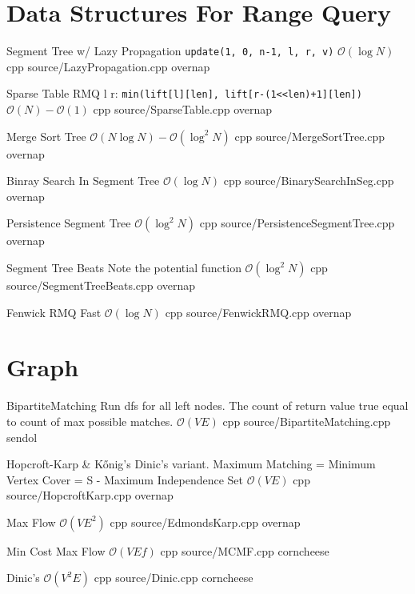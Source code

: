 \documentclass[landscape, 10pt, a4paper, oneside, twocolumn]{extarticle}
\begin{document}
\maketitlepage



\section{Data Structures For Range Query}

\Algorithm
{Segment Tree w/ Lazy Propagation}
{\texttt{update(1, 0, n-1, l, r, v)}}
{$\mathcal{O}(\log{N})$}
{cpp}
{source/LazyPropagation.cpp}
{overnap}

\Algorithm
{Sparse Table}
{RMQ l r: \texttt{min(lift[l][len], lift[r-(1<<len)+1][len])}}
{$\mathcal{O}(N)-\mathcal{O}(1)$}
{cpp}
{source/SparseTable.cpp}
{overnap}

\Algorithm
{Merge Sort Tree}
{}
{$\mathcal{O}(N\log{N})-\mathcal{O}(\log^2{N})$}
{cpp}
{source/MergeSortTree.cpp}
{overnap}

\Algorithm
{Binray Search In Segment Tree}
{}
{$\mathcal{O}(\log{N})$}
{cpp}
{source/BinarySearchInSeg.cpp}
{overnap}

\Algorithm
{Persistence Segment Tree}
{}
{$\mathcal{O}(\log^2{N})$}
{cpp}
{source/PersistenceSegmentTree.cpp}
{overnap}

\Algorithm
{Segment Tree Beats}
{Note the potential function}
{$\mathcal{O}(\log^2{N})$}
{cpp}
{source/SegmentTreeBeats.cpp}
{overnap}

\Algorithm
{Fenwick RMQ}
{}
{Fast $\mathcal{O}(\log{N})$}
{cpp}
{source/FenwickRMQ.cpp}
{overnap}

\section{Graph}

\Algorithm
{BipartiteMatching}
{Run dfs for all left nodes. The count of return value true equal to count of max possible matches.}
{$\mathcal{O}(VE)$}
{cpp}
{source/BipartiteMatching.cpp}
{sendol}

\Algorithm
{Hopcroft-Karp \& Kőnig's}
{Dinic's variant. Maximum Matching = Minimum Vertex Cover = S - Maximum Independence Set}
{$\mathcal{O}(VE)$}
{cpp}
{source/HopcroftKarp.cpp}
{overnap}

\Algorithm
{Max Flow}
{}
{$\mathcal{O}(VE^2)$}
{cpp}
{source/EdmondsKarp.cpp}
{overnap}

\Algorithm
{Min Cost Max Flow}
{}
{$\mathcal{O}(VEf)$}
{cpp}
{source/MCMF.cpp}
{corncheese}

\Algorithm
{Dinic's}
{}
{$\mathcal{O}(V^2E)$}
{cpp}
{source/Dinic.cpp}
{corncheese}
\end{document}
